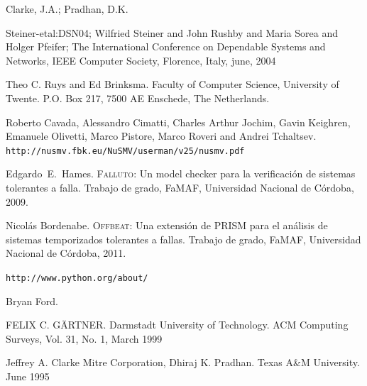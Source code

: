 \documentclass[titlepage, 12pt]{book}
\begin{document}
\begin{thebibliography}{99}


Clarke, J.A.; Pradhan, D.K.


Steiner-etal:DSN04; Wilfried Steiner and John Rushby and Maria Sorea and Holger Pfeifer;
\newblock The International Conference on Dependable Systems and Networks, IEEE Computer Society, Florence, Italy, june, 2004


Theo C. Ruys and Ed Brinksma.
\newblock Faculty of Computer Science, University of Twente. P.O. Box 217, 7500 AE Enschede, The Netherlands.


Roberto Cavada, Alessandro Cimatti, Charles Arthur Jochim, Gavin Keighren, Emanuele Olivetti, Marco Pistore, Marco Roveri and Andrei Tchaltsev.
\newblock \texttt{http://nusmv.fbk.eu/NuSMV/userman/v25/nusmv.pdf}


Edgardo~E.\ Hames.
\newblock \textsc{Falluto}: {U}n model checker para la verificaci\'on de
  sistemas tolerantes a falla.
\newblock Trabajo de grado, FaMAF, Universidad Nacional de C\'ordoba, 2009.


Nicol\'as Bordenabe.
\newblock \textsc{Offbeat}: {U}na extensi\'on de {PRISM} para el an\'alisis de
  sistemas temporizados tolerantes a fallas.
\newblock Trabajo de grado, FaMAF, Universidad Nacional de C\'ordoba, 2011.


\newblock \texttt{http://www.python.org/about/}


Bryan Ford.


FELIX C. GÄRTNER.
\newblock Darmstadt University of Technology. ACM Computing Surveys, Vol. 31, No. 1, March 1999


Jeffrey A. Clarke Mitre Corporation, Dhiraj K. Pradhan.
\newblock  Texas A\&M University. June 1995



\end{thebibliography}
\end{document}
